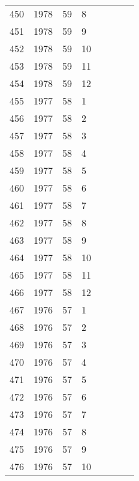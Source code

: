 \begin{longtable}{ |l|l|l|l|l|l|l|l| }
450 & 1978 & 59 &     8 &         &                &  & \\
451 & 1978 & 59 &     9 &         &                &   & \\
452 & 1978 & 59 &    10 &         &                &  & \\
453 & 1978 & 59 &    11 &         &                &  & \\
454 & 1978 & 59 &    12 &         &                &  & \\
455 & 1977 & 58 &     1 &         &                &  & \\
456 & 1977 & 58 &     2 &         &                &  & \\
457 & 1977 & 58 &     3 &         &                &  & \\
458 & 1977 & 58 &     4 &         &                &  & \\
459 & 1977 & 58 &     5 &         &                &  & \\
460 & 1977 & 58 &     6 &         &                &  & \\
461 & 1977 & 58 &     7 &         &                &  & \\
462 & 1977 & 58 &     8 &         &                &  & \\
463 & 1977 & 58 &     9 &         &                &  & \\
464 & 1977 & 58 &    10 &         &                &  & \\
465 & 1977 & 58 &    11 &         &                &  & \\
466 & 1977 & 58 &    12 &         &                &  & \\
467 & 1976 & 57 &     1 &         &                &  & \\
468 & 1976 & 57 &     2 &         &                &  & \\
469 & 1976 & 57 &     3 &         &                &  & \\
470 & 1976 & 57 &     4 &         &                &  & \\
471 & 1976 & 57 &     5 &         &                &  & \\
472 & 1976 & 57 &     6 &         &                &  & \\
473 & 1976 & 57 &     7 &         &                &  & \\
474 & 1976 & 57 &     8 &         &                &  & \\
475 & 1976 & 57 &     9 &         &                &  & \\
476 & 1976 & 57 &    10 &         &                &  & \\

\end{longtable}
